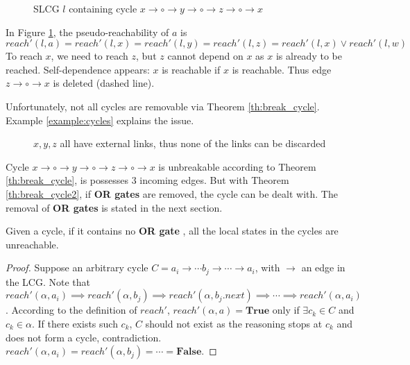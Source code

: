 \begin{example}
    \begin{figure}[ht]
        \centering
        
        \caption[SLCG with cycles]{SLCG $l$ containing cycle $x\to \circ \to y \to \circ \to z\to \circ \to x$}
        \label{cycle1}
    \end{figure}
    
    In Figure \ref{cycle1}, the pseudo-reachability of $a$ is 
    $$reach'(l,a)=reach'(l,x)=reach'(l,y)=reach'(l,z)=reach'(l,x)\lor reach'(l,w)$$
    To reach $x$, we need to reach $z$, but $z$ cannot depend on $x$ as $x$ is already to be reached. 
    Self-dependence appears: $x$ is reachable if $x$ is reachable.
    Thus edge $z\to \circ \to x$ is deleted (dashed line).
\end{example}
Unfortunately, not all cycles are removable via Theorem \ref{th:break_cycle}. Example \ref{example:cycles} explains the issue.

\begin{example}\label{example:cycles}
    \begin{figure}[ht]
        \centering
        
        \caption[Removal of cycles]{$x,y,z$ all have external links, thus none of the links can be discarded}
        \label{cycle3}
    \end{figure}
    
    Cycle $x\to \circ \to y \to \circ \to z\to \circ \to x$ is unbreakable according to Theorem \ref{th:break_cycle}, is possesses 3 incoming edges.
    But with Theorem \ref{th:break_cycle2}, if \textbf{OR gates} are removed, the cycle can be dealt with.
    The removal of \textbf{OR gates} is stated in the next section.
\end{example}

\begin{theorem}\label{th:break_cycle2}
Given a cycle, if it contains no \textbf{OR gate}%
, all the local states in the cycles are unreachable.
\end{theorem}

\begin{proof}
Suppose an arbitrary cycle $C=a_i\to \cdots b_j\to\cdots \to a_i$, with $\to$ an edge in the LCG.
Note that $reach'(\alpha,a_i)\implies reach'(\alpha,b_j)\implies reach'(\alpha,b_j.next)\implies \cdots\implies reach'(\alpha,a_i)$.
According to the definition of $reach'$, $reach'(\alpha,a)=\mathbf{True}$ only if $\exists c_k\in C$ and $c_k\in \alpha$.
If there exists such $c_k$, $C$ should not exist as the reasoning stops at $c_k$ and does not form a cycle, contradiction.
$reach'(\alpha,a_i)=reach'(\alpha,b_j)=\cdots =\mathbf{False}$.
\end{proof}

